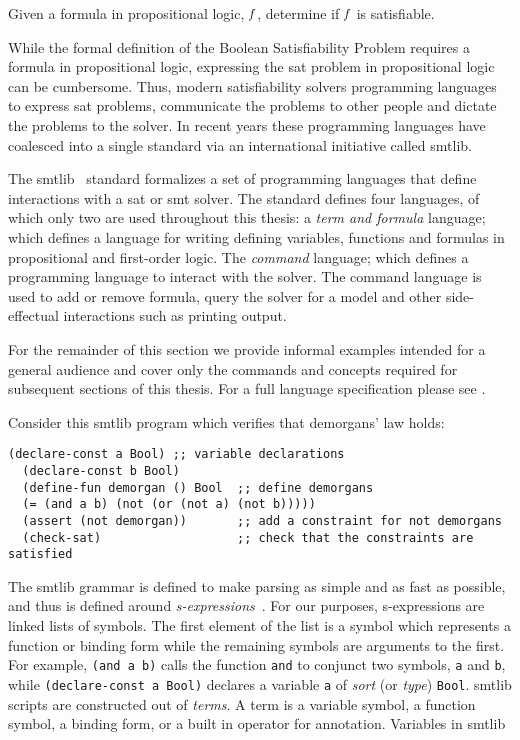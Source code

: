 \begin{definition}
  Given a formula in propositional logic, $\mathit{f}$, determine if $\mathit{f}$ is
  satisfiable.
\end{definition}

While the formal definition of the Boolean Satisfiability Problem requires a
formula in propositional logic, expressing the \ac{sat} problem in propositional
logic can be cumbersome. Thus, modern satisfiability solvers programming
languages to express \ac{sat} problems, communicate the problems to other people
and dictate the problems to the solver. In recent years these programming
languages have coalesced into a single standard via an international initiative
called \acl{smtlib}.

The \acl{smtlib}~\cite{BarFT-SMTLIB} standard formalizes a set of programming
languages that define interactions with a \ac{sat} or \ac{smt} solver. The
standard defines four languages, of which only two are used throughout this
thesis: a \emph{term and formula} language; which defines a language for writing
defining variables, functions and formulas in propositional and first-order
logic. The \emph{command} language; which defines a programming language to
interact with the solver. The command language is used to add or remove formula,
query the solver for a model and other side-effectual interactions such as
printing output.

For the remainder of this section we provide informal examples intended for a
general audience and cover only the commands and concepts required for
subsequent sections of this thesis. For a full language specification please see
\citet{BarFT-SMTLIB}.

Consider this \ac{smtlib} program which verifies that demorgans' law holds:

\begin{lstlisting}[columns=flexible,keepspaces=true,language=SMTLIB]
  (declare-const a Bool) ;; variable declarations
  (declare-const b Bool)
  (define-fun demorgan () Bool  ;; define demorgans
  (= (and a b) (not (or (not a) (not b)))))
  (assert (not demorgan))       ;; add a constraint for not demorgans
  (check-sat)                   ;; check that the constraints are satisfied
\end{lstlisting}

The \ac{smtlib} grammar is defined to make parsing as simple and as fast as
possible, and thus is defined around
\emph{s-expressions}~\cite{10.1145/367177.367199}. For our purposes,
s-expressions are linked lists of symbols. The first element of the list is a
symbol which represents a function or binding form while the remaining symbols
are arguments to the first. For example, \lstinline{(and a b)} calls the
function \lstinline{and} to conjunct two symbols, \lstinline{a} and
\lstinline{b}, while \lstinline{(declare-const a Bool)} declares a variable
\lstinline{a} of \emph{sort} (or \emph{type}) \lstinline{Bool}. \ac{smtlib}
scripts are constructed out of \emph{terms}. A term is a variable symbol, a
function symbol, a binding form, or a built in operator for annotation.
Variables in \ac{smtlib}


